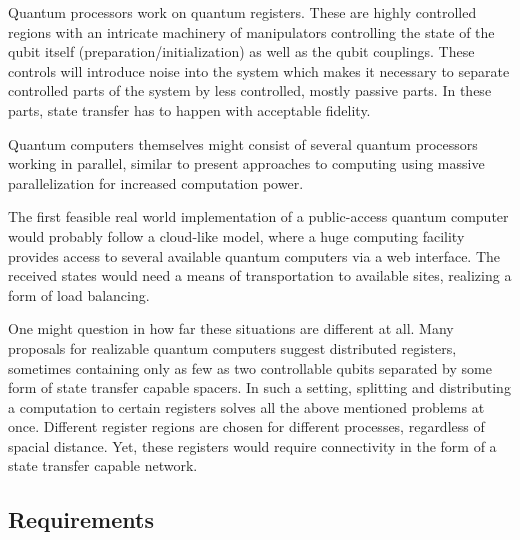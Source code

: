 \noindent Quantum processors work on quantum registers. These are highly controlled regions with an intricate machinery of manipulators controlling the state of the qubit itself (preparation/initialization) as well as the qubit couplings. These controls will introduce noise into the system which makes it necessary to separate controlled parts of the system by less controlled, mostly passive parts. In these parts, state transfer has to happen with acceptable fidelity.\par
Quantum computers themselves might consist of several quantum processors working in parallel, similar to present approaches to computing using massive parallelization for increased computation power.\par
The first feasible real world implementation of a public-access quantum computer would probably follow a cloud-like model, where a huge computing facility provides access to several available quantum computers via a web interface. The received states would need a means of transportation to available sites, realizing a form of load balancing.\par
One might question in how far these situations are different at all. Many proposals for realizable quantum computers suggest distributed registers, sometimes containing only as few as two controllable qubits separated by some form of state transfer capable spacers. In such a setting, splitting and distributing a computation to certain registers solves all the above mentioned problems at once. Different register regions are chosen for different processes, regardless of spacial distance. Yet, these registers would require connectivity in the form of a state transfer capable network. 

\subsection{Requirements}

